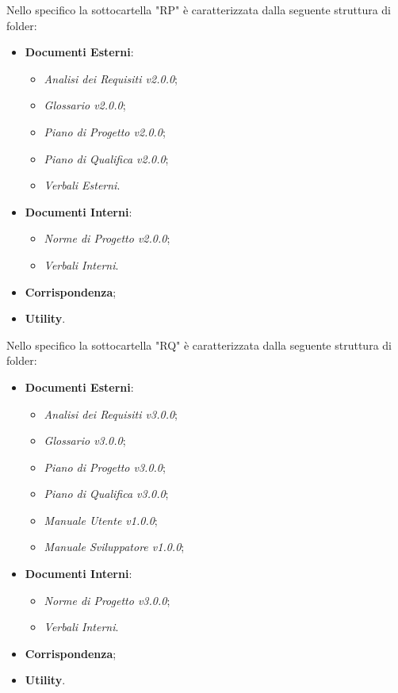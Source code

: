 	Nello specifico la sottocartella "RP" è caratterizzata dalla seguente struttura di folder:
	\begin{itemize}
	\item \textbf{Documenti Esterni}:
		\begin{itemize}
		\item \textit{Analisi dei Requisiti v2.0.0};
		\item \textit{Glossario v2.0.0};
		\item \textit{Piano di Progetto v2.0.0};
		\item \textit{Piano di Qualifica v2.0.0};
		\item \textit{Verbali Esterni}.
		\end{itemize}
	\item \textbf{Documenti Interni}:
		\begin{itemize}
		\item \textit{Norme di Progetto v2.0.0};
		\item \textit{Verbali Interni}.
		\end{itemize}
	\item \textbf{Corrispondenza};
	\item \textbf{Utility}.
	\end{itemize}
	Nello specifico la sottocartella "RQ" è caratterizzata dalla seguente struttura di folder:
	\begin{itemize}
		\item \textbf{Documenti Esterni}:
		\begin{itemize}
			\item \textit{Analisi dei Requisiti v3.0.0};
			\item \textit{Glossario v3.0.0};
			\item \textit{Piano di Progetto v3.0.0};
			\item \textit{Piano di Qualifica v3.0.0};
			\item \textit{Manuale Utente v1.0.0};
			\item \textit{Manuale Sviluppatore v1.0.0};
		\end{itemize}
		\item \textbf{Documenti Interni}:
		\begin{itemize}
			\item \textit{Norme di Progetto v3.0.0};
			\item \textit{Verbali Interni}.
		\end{itemize}
		\item \textbf{Corrispondenza};
		\item \textbf{Utility}.
	\end{itemize}

